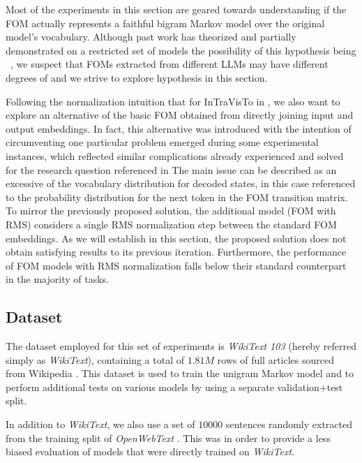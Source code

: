 Most of the experiments in this section are geared towards understanding if the FOM actually represents a faithful bigram Markov model over the original model's vocabulary.
Although past work has theorized and partially demonstrated on a restricted set of models the possibility of this hypothesis being ~\cite{elhage2021}, we suspect that FOMs extracted from different LLMs may have different degrees of  and we strive to explore  hypothesis in this section.

Following the normalization intuition that  for InTraVisTo in , we also want to explore an alternative of the basic FOM obtained from directly joining input and output embeddings.
In fact, this alternative was introduced with the intention of circumventing one particular problem emerged during some experimental instances, which reflected similar complications already experienced and solved for the research question referenced in 
The main issue can be described as an excessive  of the vocabulary distribution for decoded states, in this case referenced to the probability distribution for the next token in the FOM transition matrix.
To mirror the previously proposed solution, the additional model (FOM with RMS) considers a single RMS normalization step between the standard FOM embeddings.
As we will establish in this section, the proposed solution does not obtain satisfying results  to its previous iteration.
Furthermore, the performance of FOM models with RMS normalization falls below their standard counterpart in the majority of tasks.

\subsection{Dataset}\label{ssec:exp_fom_dataset}

The dataset employed for this set of experiments is \emph{WikiText 103}  (hereby referred simply as \emph{WikiText}), containing a total of $1.81M$ rows of full articles sourced from Wikipedia .
This dataset is used to train the unigram Markov model and to perform additional tests on various models by using a separate validation+test split.

In addition to \emph{WikiText}, we also use a set of $10000$ sentences randomly extracted from the training split of \emph{OpenWebText} .
This was  in order to provide a less biased evaluation of models that were directly trained on \emph{WikiText}.

